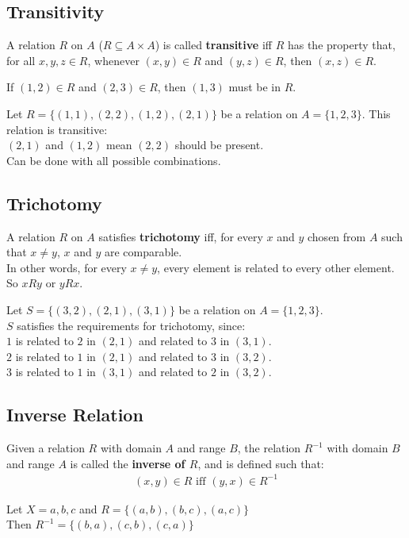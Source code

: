 \documentclass[../notes.tex]{subfiles}
\begin{document}
			\subsection{Transitivity}
				A relation $R$ on $A$ ($R \subseteq A \times A$) is called \textbf{transitive} iff $R$ has the property that, for all $x, y, z \in R$, whenever $(x, y) \in R$ and $(y, z) \in R$, then $(x, z) \in R$.
				\begin{examplebox}
					If $(1, 2) \in R$ and $(2, 3) \in R$, then $(1, 3)$ must be in $R$.
				\end{examplebox}
				\begin{examplebox}
					Let $R = \bigl\{(1, 1), (2, 2), (1, 2), (2, 1)\bigr\}$ be a relation on $A = \{1, 2, 3\}$. This relation is transitive:\\
					$(2, 1)$ and $(1, 2)$ mean $(2, 2)$ should be present.\\
					Can be done with all possible combinations.
				\end{examplebox}
			\subsection{Trichotomy}
				A relation $R$ on $A$ satisfies \textbf{trichotomy} iff, for every $x$ and $y$ chosen from $A$ such that $x \neq y$, $x$ and $y$ are comparable.\\
				In other words, for every $x \neq y$, every element is related to every other element. So $x R y$ or $y R x$.
				\begin{examplebox}
					Let $S = \bigl\{(3, 2), (2, 1), (3, 1)\bigr\}$ be a relation on $A = \{1, 2, 3\}$.\\
					$S$ satisfies the requirements for trichotomy, since:\\
					\-\hspace{1cm} $1$ is related to $2$ in $(2, 1)$ and related to $3$ in $(3, 1)$.\\
					\-\hspace{1cm} $2$ is related to $1$ in $(2, 1)$ and related to $3$ in $(3, 2)$.\\
					\-\hspace{1cm} $3$ is related to $1$ in $(3, 1)$ and related to $2$ in $(3, 2)$.
				\end{examplebox}
			\subsection{Inverse Relation}
				Given a relation $R$ with domain $A$ and range $B$, the relation $R^{-1}$ with domain $B$ and range $A$ is called the \textbf{inverse of $R$}, and is defined such that:
				\begin{align*}
					(x, y) \in R \text{ iff } (y, x) \in R^{-1}
				\end{align*}
				\begin{examplebox}
					Let $X = {a, b, c}$ and $R = \bigl\{(a, b), (b, c), (a, c)\bigr\}$\\
					Then $R^{-1} = \bigl\{(b, a), (c, b), (c, a)\bigr\}$
				\end{examplebox}
\end{document}
